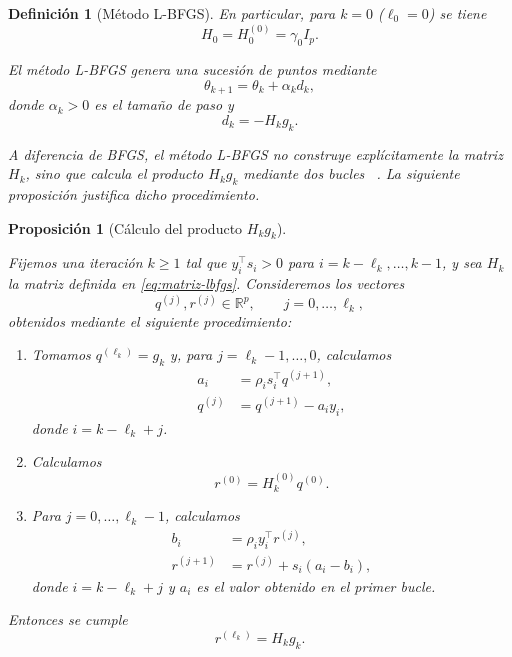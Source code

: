 \documentclass[a4paper,openany,oneside,10pt]{report}
\theoremstyle{pnlTeorema}
\newtheorem{proposicion}{Proposición}[section]
\theoremstyle{pnlDefinicion}
\newtheorem{definicion}{Definición}[section]
\theoremstyle{pnlObservacion}
\begin{document}
\begin{definicion}[Método L-BFGS]
En particular, para $k=0$ ($\ell_0=0$) se tiene
\[
    H_0=H_0^{(0)}=\gamma_0 I_p.
\]

El método L-BFGS genera una sucesión de puntos mediante
\[
    \theta_{k+1}=\theta_k+\alpha_k d_k,
\]
donde $\alpha_k>0$ es el tamaño de paso y
\[
    d_k=-H_k g_k.
\]

A diferencia de BFGS, el método L-BFGS no construye
explícitamente la matriz $H_k$, sino que calcula el
producto $H_k g_k$ mediante dos bucles%
~\cite[Algoritmo~1.6, p.~39]{andrei2020}.
La siguiente proposición justifica dicho procedimiento.

\end{definicion}

\begin{proposicion}[Cálculo del producto $H_k g_k$]
\label{prop:producto-lbfgs}

Fijemos una iteración $k\geq 1$ tal que $y_i^\top s_i>0$ para $i=k-\ell_k,\ldots,k-1$, y sea $H_k$ la matriz
definida en \eqref{eq:matriz-lbfgs}. Consideremos los vectores
\[
    q^{(j)},r^{(j)}\in\mathbb{R}^p,
    \qquad j=0,\ldots,\ell_k,
\]
obtenidos mediante el siguiente procedimiento:

\begin{enumerate}

    \item Tomamos $q^{(\ell_k)}=g_k$ y, para
    $j=\ell_k-1,\ldots,0$, calculamos
    \[
        \begin{aligned}
            a_i&=\rho_i s_i^\top q^{(j+1)},\\
            q^{(j)}&=q^{(j+1)}-a_i y_i,
        \end{aligned}
    \]
    donde $i=k-\ell_k+j$.

    \item Calculamos
    \[
        r^{(0)}=H_k^{(0)}q^{(0)}.
    \]

    \item Para $j=0,\ldots,\ell_k-1$, calculamos
    \[
        \begin{aligned}
            b_i&=\rho_i y_i^\top r^{(j)},\\
            r^{(j+1)}&=r^{(j)}+s_i(a_i-b_i),
        \end{aligned}
    \]
    donde $i=k-\ell_k+j$ y $a_i$ es el valor obtenido
    en el primer bucle.

\end{enumerate}

Entonces se cumple
\[
    r^{(\ell_k)}=H_k g_k.
\]

\end{proposicion}
\end{document}
